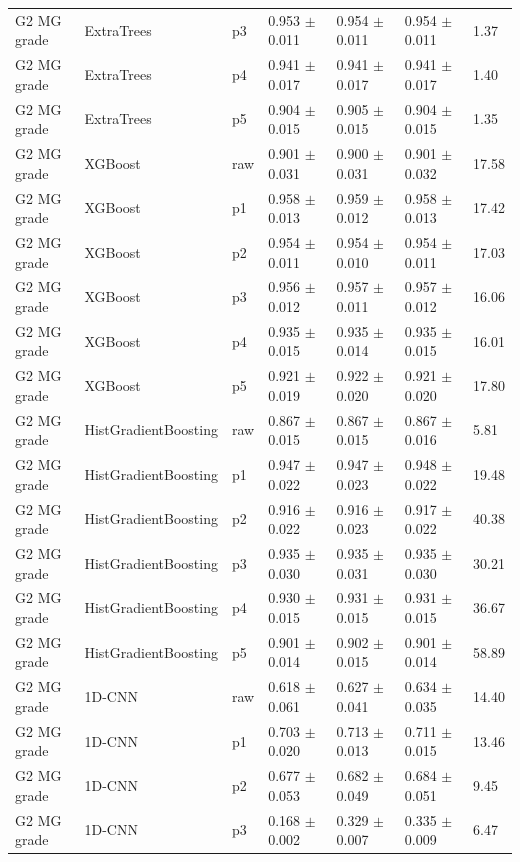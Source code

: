 {\begin{longtable}{L{2.35cm}L{2.4cm}L{1.0cm}L{2.35cm}L{2.25cm}L{2.25cm}L{1.45cm}}
G2 MG grade & ExtraTrees & p3 & 0.953 $\pm$ 0.011 & 0.954 $\pm$ 0.011 & 0.954 $\pm$ 0.011 & 1.37 \\
G2 MG grade & ExtraTrees & p4 & 0.941 $\pm$ 0.017 & 0.941 $\pm$ 0.017 & 0.941 $\pm$ 0.017 & 1.40 \\
G2 MG grade & ExtraTrees & p5 & 0.904 $\pm$ 0.015 & 0.905 $\pm$ 0.015 & 0.904 $\pm$ 0.015 & 1.35 \\
G2 MG grade & XGBoost & raw & 0.901 $\pm$ 0.031 & 0.900 $\pm$ 0.031 & 0.901 $\pm$ 0.032 & 17.58 \\
G2 MG grade & XGBoost & p1 & 0.958 $\pm$ 0.013 & 0.959 $\pm$ 0.012 & 0.958 $\pm$ 0.013 & 17.42 \\
G2 MG grade & XGBoost & p2 & 0.954 $\pm$ 0.011 & 0.954 $\pm$ 0.010 & 0.954 $\pm$ 0.011 & 17.03 \\
G2 MG grade & XGBoost & p3 & 0.956 $\pm$ 0.012 & 0.957 $\pm$ 0.011 & 0.957 $\pm$ 0.012 & 16.06 \\
G2 MG grade & XGBoost & p4 & 0.935 $\pm$ 0.015 & 0.935 $\pm$ 0.014 & 0.935 $\pm$ 0.015 & 16.01 \\
G2 MG grade & XGBoost & p5 & 0.921 $\pm$ 0.019 & 0.922 $\pm$ 0.020 & 0.921 $\pm$ 0.020 & 17.80 \\
G2 MG grade & HistGradientBoosting & raw & 0.867 $\pm$ 0.015 & 0.867 $\pm$ 0.015 & 0.867 $\pm$ 0.016 & 5.81 \\
G2 MG grade & HistGradientBoosting & p1 & 0.947 $\pm$ 0.022 & 0.947 $\pm$ 0.023 & 0.948 $\pm$ 0.022 & 19.48 \\
G2 MG grade & HistGradientBoosting & p2 & 0.916 $\pm$ 0.022 & 0.916 $\pm$ 0.023 & 0.917 $\pm$ 0.022 & 40.38 \\
G2 MG grade & HistGradientBoosting & p3 & 0.935 $\pm$ 0.030 & 0.935 $\pm$ 0.031 & 0.935 $\pm$ 0.030 & 30.21 \\
G2 MG grade & HistGradientBoosting & p4 & 0.930 $\pm$ 0.015 & 0.931 $\pm$ 0.015 & 0.931 $\pm$ 0.015 & 36.67 \\
G2 MG grade & HistGradientBoosting & p5 & 0.901 $\pm$ 0.014 & 0.902 $\pm$ 0.015 & 0.901 $\pm$ 0.014 & 58.89 \\
G2 MG grade & 1D-CNN & raw & 0.618 $\pm$ 0.061 & 0.627 $\pm$ 0.041 & 0.634 $\pm$ 0.035 & 14.40 \\
G2 MG grade & 1D-CNN & p1 & 0.703 $\pm$ 0.020 & 0.713 $\pm$ 0.013 & 0.711 $\pm$ 0.015 & 13.46 \\
G2 MG grade & 1D-CNN & p2 & 0.677 $\pm$ 0.053 & 0.682 $\pm$ 0.049 & 0.684 $\pm$ 0.051 & 9.45 \\
G2 MG grade & 1D-CNN & p3 & 0.168 $\pm$ 0.002 & 0.329 $\pm$ 0.007 & 0.335 $\pm$ 0.009 & 6.47 \\

\end{longtable}}
